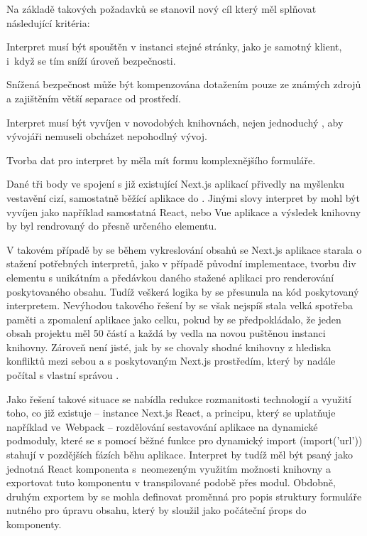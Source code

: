 Na základě takových požadavků se stanovil nový cíl který měl splňovat následující kritéria:

\begin{ul}
   \item Interpret musí být spouštěn v instanci stejné stránky, jako je samotný klient, i~když se tím sníží úroveň bezpečnosti.
   \item Snížená bezpečnost může být kompenzována dotažením pouze ze známých zdrojů a zajištěním větší separace od prostředí.
   \item Interpret musí být vyvíjen v novodobých knihovnách, nejen jednoduchý , aby vývojáři nemuseli obcházet nepohodlný vývoj.
   \item Tvorba dat pro interpret by měla mít formu komplexnějšího formuláře.
\end{ul}

Dané tři body ve spojení s již existující Next.js aplikací přivedly na myšlenku vestavění cizí, samostatně běžící aplikace do .
Jinými slovy interpret by mohl být vyvíjen jako například samostatná React, nebo Vue aplikace a výsledek knihovny by byl rendrovaný do přesně určeného  elementu.

V takovém případě by se během vykreslování obsahů se Next.js aplikace starala o stažení potřebných interpretů, jako v případě původní implementace, tvorbu \h{div} elementu s unikátním  a předávkou daného  stažené aplikaci pro renderování poskytovaného obsahu.
Tudíž veškerá logika by se přesunula na  kód poskytovaný interpretem.
Nevýhodou takového řešení by se však nejspíš stala velká spotřeba paměti a zpomalení aplikace jako celku, pokud by se předpokládalo, že jeden obsah projektu měl 50 částí a každá by vedla na novou puštěnou instanci knihovny.
Zároveň není jisté, jak by se chovaly shodné knihovny z hlediska konfliktů mezi sebou a s poskytovaným Next.js prostředím, který by nadále počítal s vlastní správou .

Jako řešení takové situace se nabídla redukce rozmanitosti technologií a využití toho, co již existuje – instance Next.js React, a principu, který se uplatňuje například ve~Webpack – rozdělování sestavování aplikace na dynamické podmoduly, které se s pomocí běžné  funkce pro dynamický import (\h{import('url')}) stahují v pozdějších fázích běhu aplikace.
Interpret by tudíž měl být psaný jako jednotná React komponenta s~neomezeným využitím možnosti knihovny a exportovat tuto komponentu v transpilované podobě přes  modul.
Obdobně, druhým exportem by se mohla definovat proměnná pro popis struktury formuláře nutného pro úpravu obsahu, který by sloužil jako počáteční \h{props} do komponenty.

